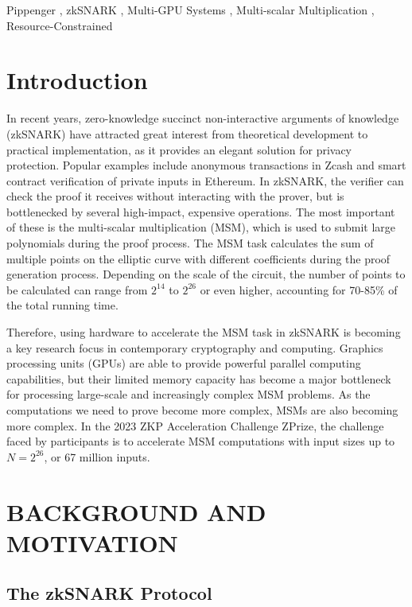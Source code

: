 \documentclass[conference]{IEEEtran}
\begin{document}
\begin{IEEEkeywords}
Pippenger , zkSNARK , Multi-GPU Systems , Multi-scalar Multiplication , Resource-Constrained
\end{IEEEkeywords}

\section{Introduction}

In recent years, zero-knowledge succinct non-interactive arguments of knowledge (zkSNARK) have attracted great interest from theoretical development to practical implementation, as it provides an elegant solution for privacy protection. Popular examples include anonymous transactions in Zcash and smart contract verification of private inputs in Ethereum. In zkSNARK, the verifier can check the proof it receives without interacting with the prover, but is bottlenecked by several high-impact, expensive operations. The most important of these is the multi-scalar multiplication (MSM), which is used to submit large polynomials during the proof process. The MSM task calculates the sum of multiple points on the elliptic curve with different coefficients during the proof generation process. Depending on the scale of the circuit, the number of points to be calculated can range from $2^{14}$ to $2^{26}$ or even higher, accounting for 70-85\% of the total running time. 

Therefore, using hardware to accelerate the MSM task in zkSNARK is becoming a key research focus in contemporary cryptography and computing. Graphics processing units (GPUs) are able to provide powerful parallel computing capabilities, but their limited memory capacity has become a major bottleneck for processing large-scale and increasingly complex MSM problems. As the computations we need to prove become more complex, MSMs are also becoming more complex. In the 2023 ZKP Acceleration Challenge ZPrize, the challenge faced by participants is to accelerate MSM computations with input sizes up to $N = 2^{26}$, or 67 million inputs.

\section{BACKGROUND AND MOTIVATION}
\subsection{The zkSNARK Protocol}
\end{document}
